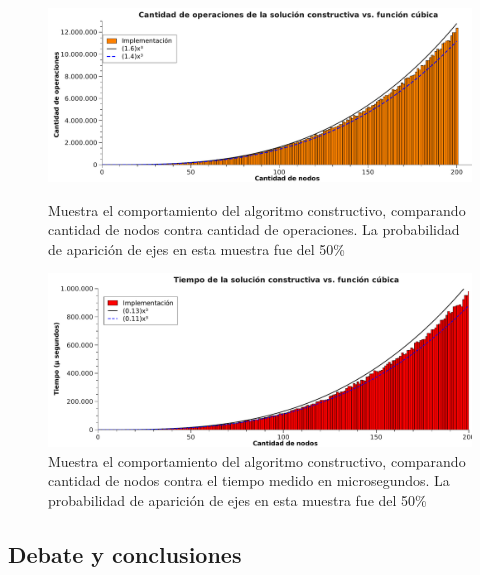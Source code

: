 \begin{figure}[htb]
    \begin{minipage}{\textwidth}
	\begin{center}
		\includegraphics[width=\textwidth]{./otros/graficos/operaciones_200nodos1_ej3.pdf}
		\caption{Muestra el comportamiento del algoritmo constructivo, comparando cantidad de nodos contra cantidad de operaciones. La probabilidad de aparición de ejes en esta muestra fue del 50\%}
		\label{ej3contarOp}
	\end{center}
    \end{minipage}

\vspace*{3cm}

    \begin{minipage}{\textwidth}
	\begin{center}
		\includegraphics[width=\textwidth]{./otros/graficos/tiempo_200nodos1_ej3.pdf}
		\caption{Muestra el comportamiento del algoritmo constructivo, comparando cantidad de nodos contra el tiempo medido en microsegundos. La probabilidad de aparición de ejes en esta muestra fue del 50\%}
		\label{ej3contarTiempo2}
	\end{center}
    \end{minipage}

\end{figure}
\clearpage 

\subsection{Debate y conclusiones}
